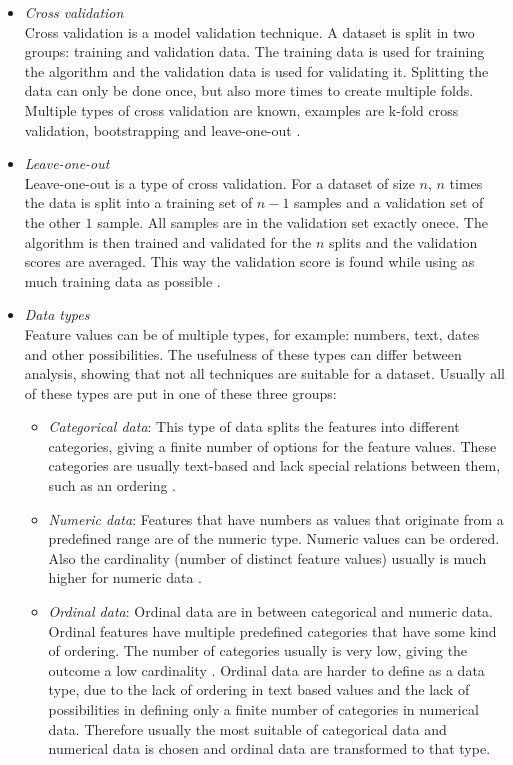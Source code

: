 \documentclass[10pt,a4paper]{report}
\begin{document}
\begin{itemize}
		\item \textit{Cross validation} \\
		Cross validation is a model validation technique. A dataset is split in two groups: training and validation data. The training data is used for training the algorithm and the validation data is used for validating it. Splitting the data can only be done once, but also more times to create multiple folds. Multiple types of cross validation are known, examples are k-fold cross validation, bootstrapping and leave-one-out \cite{kohavi1995study}.
		\item \textit{Leave-one-out} \\
		Leave-one-out is a type of cross validation. For a dataset of size $n$, $n$ times the data is split into a training set of $n-1$ samples and a validation set of the other $1$ sample. All samples are in the validation set exactly onece. The algorithm is then trained and validated for the $n$ splits and the validation scores are averaged. This way the validation score is found while using as much training data as possible \cite{kearns1999algorithmic}. 
		\item \textit{Data types} \\
		Feature values can be of multiple types, for example: numbers, text, dates and other possibilities. The usefulness of these types can differ between analysis, showing that not all techniques are suitable for a dataset. Usually all of these types are put in one of these three groups:
		\begin{itemize}
			\item \textit{Categorical data}: This type of data splits the features into different categories, giving a finite number of options for the feature values. These categories are usually text-based and lack special relations between them, such as an ordering \cite{agresti2003categorical}. 
			\item \textit{Numeric data}: Features that have numbers as values that originate from a predefined range are of the numeric type. Numeric values can be ordered. Also the cardinality (number of distinct feature values) usually is much higher for numeric data \cite{edwards2002explaining}. 
			\item \textit{Ordinal data}: Ordinal data are in between categorical and numeric data. Ordinal features have multiple predefined categories that have some kind of ordering. The number of categories usually is very low, giving the outcome a low cardinality \cite{han2011data}. Ordinal data are harder to define as a data type, due to the lack of ordering in text based values and the lack of possibilities in defining only a finite number of categories in numerical data. Therefore usually the most suitable of categorical data and numerical data is chosen and ordinal data are transformed to that type.

\end{itemize}
\end{itemize}
\end{document}
